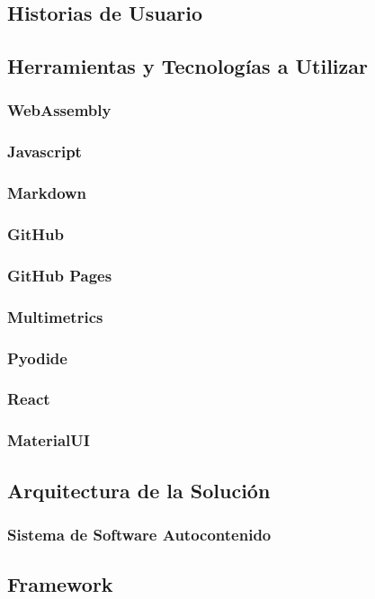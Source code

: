 \documentclass[letterpaper,12pt]{article}
\begin{document}
\subsection{Historias de Usuario}
\subsection{Herramientas y Tecnologías a Utilizar}
\subsubsection{WebAssembly}
\subsubsection{Javascript}
\subsubsection{Markdown}
\subsubsection{GitHub}
\subsubsection{GitHub Pages}
\subsubsection{Multimetrics}
\subsubsection{Pyodide}
\subsubsection{React}
\subsubsection{MaterialUI}
\subsection{Arquitectura de la Solución}
\subsubsection{Sistema de Software Autocontenido}

\subsection{Framework}
\end{document}
